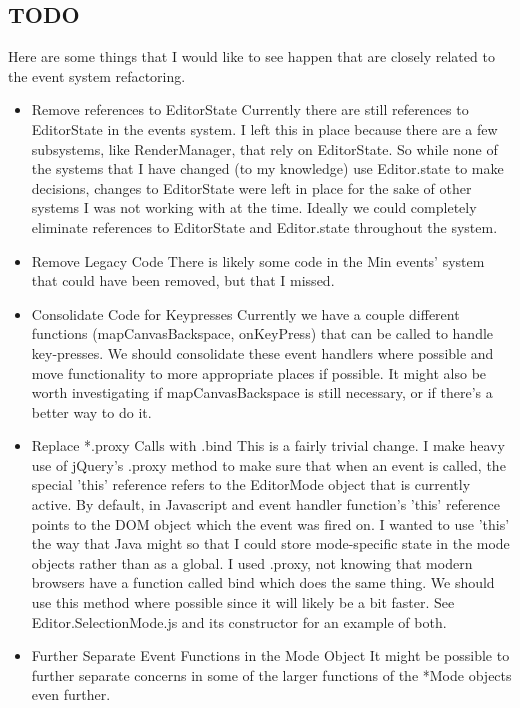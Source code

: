 \documentclass[letterpaper]{article}
\begin{document}
\subsection{TODO}

Here are some things that I would like to see happen that are closely related to
the event system refactoring.

\begin{itemize}
    \item{Remove references to EditorState} Currently there are still references
        to EditorState in the events system. I left this in place because there
        are a few subsystems, like RenderManager, that rely on EditorState. So
        while none of the systems that I have changed (to my knowledge) use
        Editor.state to make decisions, changes to EditorState were left in
        place for the sake of other systems I was not working with at the time.
        Ideally we could completely eliminate references to EditorState and
        Editor.state throughout the system.
    \item{Remove Legacy Code} There is likely some code in the Min events' system
        that could have been removed, but that I missed. 
    \item{Consolidate Code for Keypresses} Currently we have a couple different
        functions (mapCanvasBackspace, onKeyPress) that can be called to handle key-presses. We should
        consolidate these event handlers where possible and move functionality
        to more appropriate places if possible. It might also be worth
        investigating if mapCanvasBackspace is still necessary, or if there's a
        better way to do it.
    \item{Replace *.proxy Calls with .bind} This is a fairly trivial change. I
        make heavy use of jQuery's .proxy method to make sure that when an event
        is called, the special 'this' reference refers to the EditorMode object
        that is currently active. By default, in Javascript and event handler
        function's 'this' reference points to the DOM object which the event was
        fired on. I wanted to use 'this' the way that Java might so that I could
        store mode-specific state in the mode objects rather than as a global. I
        used .proxy, not knowing that modern browsers have a function called
        bind which does the same thing. We should use this method where possible
        since it will likely be a bit faster. See Editor.SelectionMode.js and
        its constructor for an example of both.
    \item{Further Separate Event Functions in the Mode Object} It might be
        possible to further separate concerns in some of the larger functions of
        the *Mode objects even further. 
\end{itemize}
\end{document}
